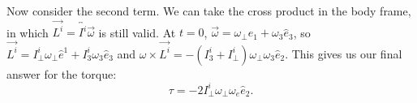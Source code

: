 Now consider the second term.  We can take the cross product in the body frame, in which $\vec{L^i} = \overleftrightarrow{I^i} \vec{\omega}$ is still valid.  At $t = 0$, $\vec{\omega} = \omega_\bot \hat{e}_1 + \omega_3 \hat{e}_3$, so $\vec{L^i} = I^i_\bot \omega_\bot \hat{e}^1 + I^i_3 \omega_3 \hat{e}_3$ and $\omega \times \vec{L^i} = - (I^i_3 + I^i_\bot) \omega_\bot \omega_3 \hat{e}_2$.  This gives us our final answer for the torque: $$\boxed{\tau = - 2 I^i_\bot \omega_\bot \omega_e \hat{e}_2.}$$


